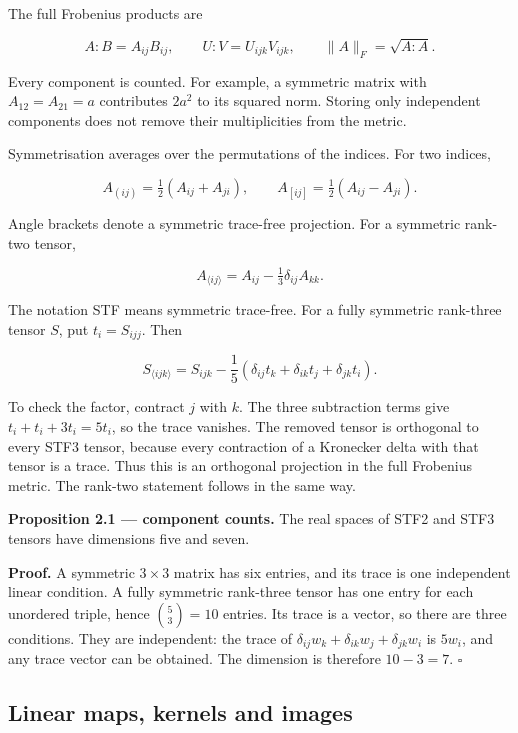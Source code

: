 \documentclass[
  11pt,
  a4paper]{article}
\begin{document}
The full Frobenius products are

\[
A:B=A_{ij}B_{ij},\qquad
U:V=U_{ijk}V_{ijk},\qquad
\|A\|_F=\sqrt{A:A}.
\tag{2.1}
\]

Every component is counted. For example, a symmetric matrix with \(A_{12}=A_{21}=a\) contributes \(2a^2\) to its squared norm. Storing only independent components does not remove their multiplicities from the metric.

Symmetrisation averages over the permutations of the indices. For two indices,

\[
A_{(ij)}=\tfrac12(A_{ij}+A_{ji}),\qquad
A_{[ij]}=\tfrac12(A_{ij}-A_{ji}).
\tag{2.2}
\]

Angle brackets denote a symmetric trace-free projection. For a symmetric rank-two tensor,

\[
A_{\langle ij\rangle}=A_{ij}-\tfrac13\delta_{ij}A_{kk}.
\tag{2.3}
\]

The notation STF means symmetric trace-free. For a fully symmetric rank-three tensor \(S\), put \(t_i=S_{ijj}\). Then

\[
S_{\langle ijk\rangle}
=S_{ijk}-\frac15(\delta_{ij}t_k+\delta_{ik}t_j+\delta_{jk}t_i).
\tag{2.4}
\]

To check the factor, contract \(j\) with \(k\). The three subtraction terms give \(t_i+t_i+3t_i=5t_i\), so the trace vanishes. The removed tensor is orthogonal to every STF3 tensor, because every contraction of a Kronecker delta with that tensor is a trace. Thus this is an orthogonal projection in the full Frobenius metric. The rank-two statement follows in the same way.

\textbf{Proposition 2.1 --- component counts.} The real spaces of STF2 and STF3 tensors have dimensions five and seven.

\textbf{Proof.} A symmetric \(3\times3\) matrix has six entries, and its trace is one independent linear condition. A fully symmetric rank-three tensor has one entry for each unordered triple, hence \(\binom{5}{3}=10\) entries. Its trace is a vector, so there are three conditions. They are independent: the trace of \(\delta_{ij}w_k+\delta_{ik}w_j+\delta_{jk}w_i\) is \(5w_i\), and any trace vector can be obtained. The dimension is therefore \(10-3=7\). \(\square\)

\hypertarget{linear-maps-kernels-and-images}{%
\subsection{Linear maps, kernels and images}\label{linear-maps-kernels-and-images}}
\end{document}

